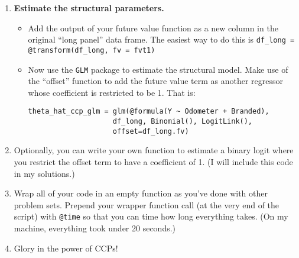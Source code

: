 \documentclass[12pt,english]{article}
\begin{document}
\begin{enumerate}
\begin{enumerate}
        \item \textbf{Estimate the structural parameters.}
        \begin{itemize}
            \item Add the output of your future value function as a new column in the original ``long panel'' data frame. The easiest way to do this is \texttt{df\_long = @transform(df\_long, fv = fvt1)}
            \item Now use the \texttt{GLM} package to estimate the structural model. Make use of the ``offset'' function to add the future value term as another regressor whose coefficient is restricted to be 1. That is:
            \begin{verbatim}
theta_hat_ccp_glm = glm(@formula(Y ~ Odometer + Branded), 
                    df_long, Binomial(), LogitLink(), 
                    offset=df_long.fv)
                \end{verbatim}
        \end{itemize}
        \item Optionally, you can write your own function to estimate a binary logit where you restrict the offset term to have a coefficient of 1. (I will include this code in my solutions.)
    \item Wrap all of your code in an empty function as you've done with other problem sets. Prepend your wrapper function call (at the very end of the script) with \texttt{@time} so that you can time how long everything takes. (On my machine, everything took under 20 seconds.)
    \item Glory in the power of CCPs!
    \end{enumerate}




\end{enumerate}
\end{document}
